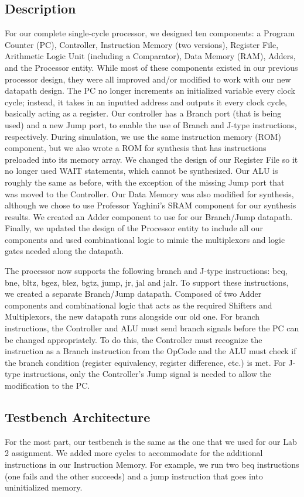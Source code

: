\documentclass{article}
\begin{document}
\subsection{Description}
For our complete single-cycle processor, we designed ten components: a Program Counter (PC), Controller, Instruction Memory (two versions), Register File, Arithmetic Logic Unit (including a Comparator), Data Memory (RAM), Adders, and the Processor entity. While most of these components existed in our previous processor design, they were all improved and/or modified to work with our new datapath design. The PC no longer increments an initialized variable every clock cycle; instead, it takes in an inputted address and outputs it every clock cycle, basically acting as a register. Our controller has a Branch port (that is being used) and a new Jump port, to enable the use of Branch and J-type instructions, respectively. During simulation, we use the same instruction memory (ROM) component, but we also wrote a ROM for synthesis that has instructions preloaded into its memory array. We changed the design of our Register File so it no longer used WAIT statements, which cannot be synthesized. Our ALU is roughly the same as before, with the exception of the missing Jump port that was moved to the Controller. Our Data Memory was also modified for synthesis, although we chose to use Professor Yaghini's SRAM component for our synthesis results. We created an Adder component to use for our Branch/Jump datapath. Finally, we updated the design of the Processor entity to include all our components and used combinational logic to mimic the multiplexors and logic gates needed along the datapath. 

The processor now supports the following branch and J-type instructions: beq, bne, bltz, bgez, blez, bgtz, jump, jr, jal and jalr. To support these instructions, we created a separate Branch/Jump datapath. Composed of two Adder components and combinational logic that acts as the required Shifters and Multiplexors, the new datapath runs alongside our old one. For branch instructions, the Controller and ALU must send branch signals before the PC can be changed appropriately. To do this, the Controller must recognize the instruction as a Branch instruction from the OpCode and the ALU must check if the branch condition (register equivalency, register difference, etc.) is met. For J-type instructions, only the Controller's Jump signal is needed to allow the modification to the PC.

\subsection{Testbench Architecture}
For the most part, our testbench is the same as the one that we used for our Lab 2 assignment. We added more cycles to accommodate for the additional instructions in our Instruction Memory. For example, we run two beq instructions (one fails and the other succeeds) and a jump instruction that goes into uninitialized memory.
\end{document}
